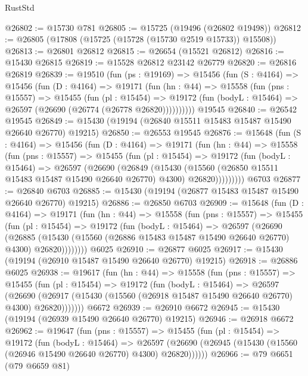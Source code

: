 \begin{lexlean}{RustStd}
\begin{coremodule}
{\begin{coremodule}
{{{{{{{{{{{{{{{{{{{{{{{{{{{{{{{{{{{{{{{{{{{{{{{{{{{{{{{{{{{{@26802 := @15730 @781
@26805 := @15725 (@19496 (@26802 @19498))
@26812 := @26805 (@17808 (@15725 (@15728 (@15730 @2519 @15733)) @15508))
@26813 := @26801 @26812
@26815 := @26654 (@15521 @26812)
@26816 := @15430 @26815
@26819 := @15528 @26812 @23142 @26779
@26820 := @26816 @26819
@26839 := @19510
    (fun (ps : @19169) =>
    @15456
      (fun (S : @4164) =>
      @15456
        (fun (D : @4164) =>
        @19171
          (fun (hn : @44) =>
          @15558
            (fun (pns : @15557) =>
            @15455
              (fun (pl : @15454) =>
              @19172 (fun (bodyL : @15464) => @26597 (@26690 (@26774 (@26778 @26820))))))))))
    @19545
@26840 := @26542 @19545
@26849 := @15430 (@19194 (@26840 @15511 @15483 @15487 @15490 @26640 @26770) @19215)
@26850 := @26553 @19545
@26876 := @15648
    (fun (S : @4164) =>
    @15456
      (fun (D : @4164) =>
      @19171
        (fun (hn : @44) =>
        @15558
          (fun (pns : @15557) =>
          @15455
            (fun (pl : @15454) =>
            @19172
              (fun (bodyL : @15464) =>
              @26597
                (@26690
                  (@26849
                    (@15430
                      (@15560 (@26850 @15511 @15483 @15487 @15490 @26640 @26770) @4300)
                      @26820)))))))))
    @6703
@26877 := @26840 @6703
@26885 := @15430 (@19194 (@26877 @15483 @15487 @15490 @26640 @26770) @19215)
@26886 := @26850 @6703
@26909 := @15648
    (fun (D : @4164) =>
    @19171
      (fun (hn : @44) =>
      @15558
        (fun (pns : @15557) =>
        @15455
          (fun (pl : @15454) =>
          @19172
            (fun (bodyL : @15464) =>
            @26597
              (@26690
                (@26885
                  (@15430 (@15560 (@26886 @15483 @15487 @15490 @26640 @26770) @4300) @26820))))))))
    @6025
@26910 := @26877 @6025
@26917 := @15430 (@19194 (@26910 @15487 @15490 @26640 @26770) @19215)
@26918 := @26886 @6025
@26938 := @19617
    (fun (hn : @44) =>
    @15558
      (fun (pns : @15557) =>
      @15455
        (fun (pl : @15454) =>
        @19172
          (fun (bodyL : @15464) =>
          @26597
            (@26690
              (@26917 (@15430 (@15560 (@26918 @15487 @15490 @26640 @26770) @4300) @26820)))))))
    @6672
@26939 := @26910 @6672
@26945 := @15430 (@19194 (@26939 @15490 @26640 @26770) @19215)
@26946 := @26918 @6672
@26962 := @19647
    (fun (pns : @15557) =>
    @15455
      (fun (pl : @15454) =>
      @19172
        (fun (bodyL : @15464) =>
        @26597 (@26690 (@26945 (@15430 (@15560 (@26946 @15490 @26640 @26770) @4300) @26820))))))
@26966 := @79 @6651 (@79 @6659 @81)
}}}}}}}}}}}}}}}}}}}}}}}}}}}}}}}}}}}}}}}}}}}}}}}}}}}}}}}}}}}}
\end{coremodule}}
\end{coremodule}
\end{lexlean}
